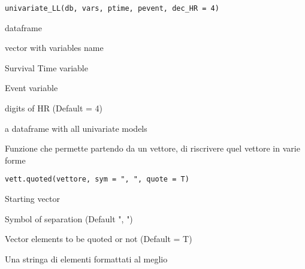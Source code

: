\documentclass[a4paper]{book}
\begin{document}
%
\begin{Usage}
\begin{verbatim}
univariate_LL(db, vars, ptime, pevent, dec_HR = 4)
\end{verbatim}
\end{Usage}
%
\begin{Arguments}
\begin{ldescription}
\item[\code{db}] dataframe

\item[\code{vars}] vector with variables name

\item[\code{ptime}] Survival Time variable

\item[\code{pevent}] Event variable

\item[\code{dec\_HR}] digits of HR (Default = 4)
\end{ldescription}
\end{Arguments}
%
\begin{Value}
a dataframe with all univariate models
\end{Value}
%
\begin{Description}
Funzione che permette partendo da un vettore, di riscrivere quel vettore in varie forme
\end{Description}
%
\begin{Usage}
\begin{verbatim}
vett.quoted(vettore, sym = ", ", quote = T)
\end{verbatim}
\end{Usage}
%
\begin{Arguments}
\begin{ldescription}
\item[\code{vettore}] Starting vector

\item[\code{sym}] Symbol of separation (Default ", ")

\item[\code{quote}] Vector elements to be quoted or not (Default = T)
\end{ldescription}
\end{Arguments}
%
\begin{Value}
Una stringa di elementi formattati al meglio
\end{Value}
\printindex{}
\end{document}
